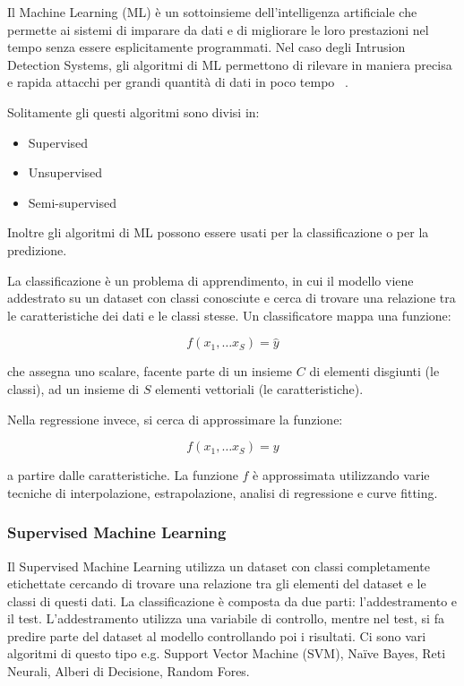 Il Machine Learning (ML) è un sottoinsieme dell'intelligenza artificiale che permette ai sistemi di imparare da dati e di migliorare le loro prestazioni nel tempo senza essere esplicitamente programmati. Nel caso degli Intrusion Detection Systems, gli algoritmi di ML permettono di rilevare in maniera precisa e rapida attacchi per grandi quantità di dati in poco tempo ~\cite{saranyaPerformanceAnalysisMachine2020}.


Solitamente gli questi algoritmi sono divisi in:


\begin{itemize}
    \item Supervised
    \item Unsupervised 
    \item Semi-supervised
\end{itemize}

Inoltre gli algoritmi di ML possono essere usati per la classificazione o per la predizione.

La classificazione è un problema di apprendimento, in cui il modello viene addestrato su un dataset con classi conosciute e cerca di trovare una relazione tra le caratteristiche dei dati e le classi stesse. 
Un classificatore mappa una funzione: 

\[
f(x_1,\ldots x_S) = \hat y
\]

che assegna uno scalare, facente parte di un insieme $C$ di elementi disgiunti (le classi), ad un insieme di $S$ elementi vettoriali (le caratteristiche). ~\cite{hoffmannBenchmarkingClassificationRegression2019}


Nella regressione invece, si cerca di approssimare la funzione: 

\[
f(x_1,\ldots x_S) = y
\]

a partire dalle caratteristiche. La funzione $f$ è approssimata utilizzando varie tecniche di interpolazione, estrapolazione, analisi di regressione e curve fitting. ~\cite{hoffmannBenchmarkingClassificationRegression2019}



\subsubsection{Supervised Machine Learning}

Il Supervised Machine Learning utilizza un dataset con classi completamente etichettate cercando di trovare una relazione tra gli elementi del dataset e le classi di questi dati. 
La classificazione è composta da due parti: l'addestramento e il test. L'addestramento utilizza una variabile di controllo, mentre nel test, si fa predire parte del dataset al modello controllando poi i risultati. Ci sono vari algoritmi di questo tipo e.g. Support Vector Machine (SVM), Naïve Bayes, Reti Neurali, Alberi di Decisione, Random Fores.


